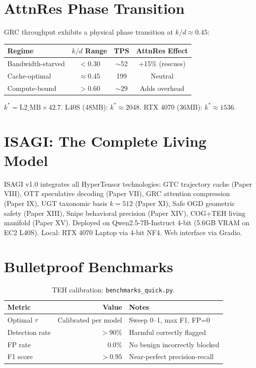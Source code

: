 \documentclass[11pt,a4paper]{article}
\begin{document}
\newpage

\section{AttnRes Phase Transition}

GRC throughput exhibits a physical phase transition at $k/d \approx 0.45$:

\begin{table}[h]\centering
\begin{tabular}{lccc}\toprule
Regime & $k/d$ Range & TPS & AttnRes Effect \\\midrule
Bandwidth-starved & $<0.30$ & $\sim$52 & +15\% (rescues) \\
Cache-optimal & $\approx 0.45$ & 199 & Neutral \\
Compute-bound & $>0.60$ & $\sim$29 & Adds overhead \\\bottomrule
\end{tabular}
\end{table}

$k^* = \mathrm{L2\_MB} \times 42.7$. L40S (48MB): $k^* \approx 2048$. RTX 4070 (36MB): $k^* \approx 1536$.

\newpage

\section{ISAGI: The Complete Living Model}

ISAGI v1.0 integrates all HyperTensor technologies: GTC trajectory cache (Paper VIII), OTT speculative decoding (Paper VII), GRC attention compression (Paper IX), UGT taxonomic basis $k=512$ (Paper XI), Safe OGD geometric safety (Paper XIII), Snipe behavioral precision (Paper XIV), COG+TEH living manifold (Paper XV). Deployed on Qwen2.5-7B-Instruct 4-bit (5.6GB VRAM on EC2 L40S). Local: RTX 4070 Laptop via 4-bit NF4. Web interface via Gradio.

\section{Bulletproof Benchmarks}

\begin{table}[h]\centering
\begin{tabular}{lrl}\toprule
Metric & Value & Notes \\\midrule
Optimal $\tau$ & Calibrated per model & Sweep 0--1, max F1, FP=0 \\
Detection rate & $>90\%$ & Harmful correctly flagged \\
FP rate & 0.0\% & No benign incorrectly blocked \\
F1 score & $>0.95$ & Near-perfect precision-recall \\\bottomrule
\end{tabular}
\caption{TEH calibration: \texttt{benchmarks\_quick.py}.}
\end{table}
\end{document}

